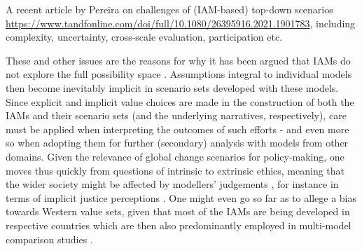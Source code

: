 \documentclass{article}
\begin{document}
\begin{refsection}


A recent article by Pereira on challenges of (IAM-based) top-down scenarios \url{https://www.tandfonline.com/doi/full/10.1080/26395916.2021.1901783}, including complexity, uncertainty, cross-scale evaluation, participation etc.

These and other issues are the reasons for why it has been argued that IAMs do not explore the full possibility space \parencite{keppo_2021,mccollum_2020, gambhir_2022}. Assumptions integral to individual models then become inevitably implicit in scenario sets developed with these models. Since explicit and implicit value choices are made in the construction of both the IAMs and their scenario sets (and the underlying narratives, respectively), care must be applied when interpreting the outcomes of such efforts \parencite[even if it is only reference scenarios; see e.g.][]{grant_2020} - and even more so when adopting them for further (secondary) analysis with models from other domains. Given the relevance of global change scenarios for policy-making, one moves thus quickly from questions of intrinsic to extrinsic ethics, meaning that the wider society might be affected by modellers' judgements \parencite{beck_2016},\footnotemark{} for instance in terms of implicit justice perceptions \parencite{rubiano_2022}. One might even go so far as to allege a bias towards Western value sets, given that most of the IAMs are being developed in respective countries which are then also predominantly employed in multi-model comparison studies \parencite{duan_2019}.



\end{refsection}
\end{document}
